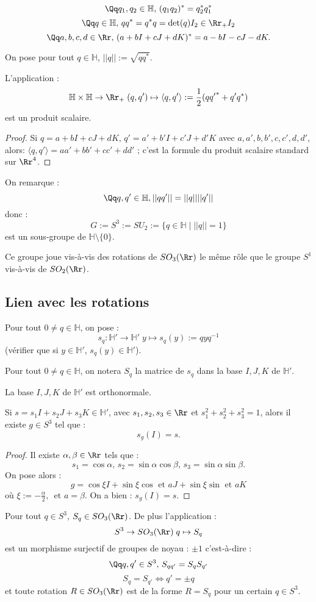 \documentclass[class=report,crop=false]{standalone}
\newcommand{\Hh}{\mathbb{H}}
\begin{document}
\[\Qq q_1,q_2 \in \Hh,\, (q_1q_2)^* = q_2^*q_1^*\]
\[\Qq q \in \Hh,\, qq^* = q^*q = \det (q)I_2 \in \Rr_+I_2\]
\[\Qq a,b,c,d \in \Rr,\, (a+bI+cJ+dK)^*= a-bI-cJ-dK .\]
\begin{definition}
On pose pour tout $q \in \Hh$, $||q||:=\sqrt{qq^*}$. 
\end{definition}

\begin{proposition}
L'application :
\[\Hh \times \Hh \to \Rr_+ \; (q,q') \mapsto \langle q,q' \rangle := \frac{1}{2}(q{q'}^* +q'q^*)\]
est un produit scalaire.
\end{proposition}

\begin{proof}
Si $q = a+bI+cJ+dK, \, q'= a' + b'I + c'J +d'K$ avec $a,a',b,b',c,c',d,d'$, alors: $\langle q,q'\rangle = aa' +bb'+cc'+dd'$ ; c'est la formule du produit scalaire standard sur $\Rr^4$.
\end{proof}

On remarque :
\[\Qq q,q'\in \Hh, ||qq'|| = ||q||||q'||\]
donc :
\[G:=S^3:=SU_2:=\{q \in \Hh \mid ||q|| = 1\}\]
est un sous-groupe de $\Hh\setminus\{0\}$.

Ce groupe joue vis-à-vis des rotations de $SO_3(\Rr)$ le même rôle que le groupe $S^1$ vis-à-vis de $SO_2(\Rr)$.
\subsection{Lien avec les rotations}

Pour tout $0 \neq q \in \Hh $, on pose :
\[s_q : \Hh' \to \Hh' \; y \mapsto s_q(y):=qyq^{-1}\]
(vérifier que si $y \in \Hh'$, $s_q(y)\in\Hh' $).

Pour tout $0\neq q \in \Hh$, on notera $S_q$ la matrice de $s_q$ dans la base $I,J, K $ de $\Hh'$. 

\begin{remarque*}
La base $I,J,K$ de $\Hh'$ est orthonormale.
\end{remarque*}

\begin{lemme}
Si $s = s_1I + s_2 J + s_3K \in \Hh'$, avec $s_1,s_2,s_3 \in \Rr$ et $s_1^2+s_2^2 + s_3^2 =1$, alors il existe $g \in S^3$ tel que :
\[s_g(I) = s .\]
\end{lemme}

\begin{proof}
Il existe $\alpha, \beta \in \Rr$ tels que :
\[s_1 = \cos \alpha, \,s_2 = \sin \alpha \cos \beta,\, s_3= \sin \alpha \sin \beta .\]
On pose alors :
\[g = \cos \xi I + \sin \xi \cos \text{ et }a J +\sin \xi \sin \text{ et }a K\]
où $\xi := -\frac{\alpha}{2},\, \text{ et }a =\beta$. On a bien : $s_g(I) = s$.
\end{proof}
\begin{theoreme}
Pour tout $q \in S^3$, $S_q \in SO_3(\Rr)$. De plus l'application :
\[S^3 \to SO_3(\Rr) \; q \mapsto S_q\]
est un morphisme surjectif de groupes de noyau : $\pm 1$ c'est-à-dire :
\[\Qq q,q'\in S^3,\, S_{qq'} = S_qS_{q'} \]\[ S_q = S_{q' } \iff q' = \pm q \]
et  toute rotation $R\in SO_3(\Rr)$ est de la forme $R =S_q$ pour un certain $q\in S^3$.

\end{theoreme}
\end{document}
